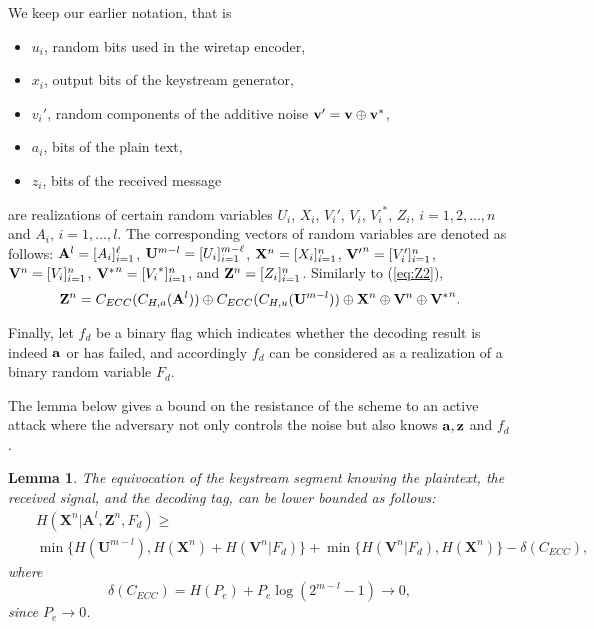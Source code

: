 \documentclass{article}[11pt]
\newcommand{\am}{\mathbf{A}}
\newcommand{\um}{\mathbf{U}}
\newcommand{\vm}{\mathbf{V}}
\newcommand{\xm}{\mathbf{X}}
\newcommand{\zm}{\mathbf{Z}}
\newtheorem{lemma}{Lemma}
\begin{document}
We keep our earlier notation, that is
\begin{itemize}
\item
$u_i$, random bits used in the wiretap encoder,
\item
$x_i$, output bits of the keystream generator,
\item
$v_i'$, random components of the additive noise ${\bf v}' = {\bf v}
\oplus {\bf v}^*$,
\item
$a_i$, bits of the plain text,
\item
$z_i$, bits of the received message
\end{itemize}
are realizations of certain random variables $U_i$, $X_i$, $V_i'$, $V_i$, ${V_i}^*$, $Z_i$, $i=1,2,...,n$
and $A_i$, $i=1,\ldots,l$. The corresponding vectors of random variables are
denoted as follows: ${\bf A}^l = [A_i]_{i=1}^{\ell}$,
${\bf U}^{m-l}= [U_i]_{i=1}^{m-\ell}$, ${\bf X}^n= [X_i]_{i=1}^n$,
${{\bf V}'}^n=[V_i']_{i=1}^n$, ${{\bf V}}^n=[V_i]_{i=1}^n$, ${{\bf V}^*}^n=[{V_i}^*]_{i=1}^n$,
and ${\bf Z}^n = [Z_i]_{i=1}^n$. Similarly to (\ref{eq:Z2}),
\begin{equation}\label{eq:Z2act}
{\bf Z}^n = C_{ECC}(C_{H,a}({\bf A}^l))\oplus C_{ECC}(C_{H,u}({\bf
U}^{m-l})) \oplus{\bf X}^n \oplus {\bf V}^n\oplus{{\bf V}^*}^n.
\end{equation}

Finally, let $f_d$ be a binary flag which indicates whether the
decoding result is indeed ${\bf a}$ or has failed, and accordingly $f_d$ can be considered as a
realization of a binary random variable $F_d$.

The lemma below gives a bound on the resistance of the scheme to an active attack
where the adversary not only controls the noise but also knows ${\bf a},{\bf z}$
and $f_d$.
\begin{lemma}\label{lem:boundactive}
The equivocation of the keystream segment knowing the plaintext,
the received signal, and the decoding tag, can be lower bounded as
follows:
\begin{eqnarray*}
&& H(\xm^n|\am^l,\zm^n, F_d)\geq \\
& & \min \{H(\um^{m-l}), H(\xm^n)+ H(\vm^n|F_d)\}+
\min \{H(\vm^n|F_d), H(\xm^n) \} - \delta(C_{ECC}),
\end{eqnarray*}
where
\[
\delta(C_{ECC})  =  H(P_e)+P_e \log(2^{m-l}-1)\rightarrow 0,
\]
since $P_e\rightarrow 0$.
\end{lemma}
\end{document}
